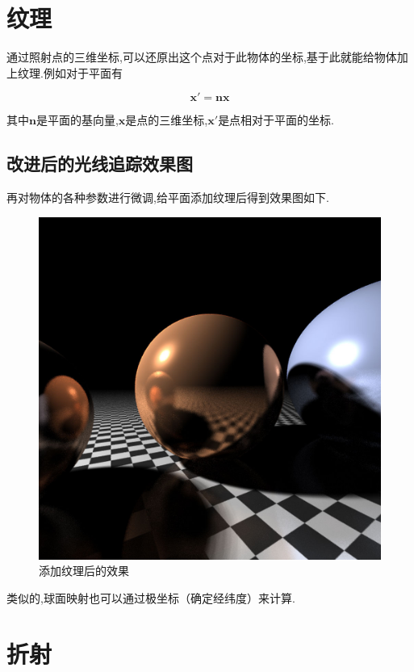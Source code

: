 \documentclass[10pt,twocolumn]{article}
\begin{document}
\section{\hei 纹理}
通过照射点的三维坐标,可以还原出这个点对于此物体的坐标,基于此就能给物体加上纹理.例如对于平面有

\begin{equation}
\mathbf{x'}=\mathbf{nx}
\end{equation}

其中$\mathbf{n}$是平面的基向量,$\mathbf{x}$是点的三维坐标,$\mathbf{x'}$是点相对于平面的坐标.

\subsection{\hei 改进后的光线追踪效果图}
再对物体的各种参数进行微调,给平面添加纹理后得到效果图如下.
\begin{figure}[ht]
\centering
\includegraphics[scale=.2]{fig9.jpg}
\caption{添加纹理后的效果}
\end{figure}

类似的,球面映射也可以通过极坐标（确定经纬度）来计算.

\section{\hei 折射}
\end{document}
